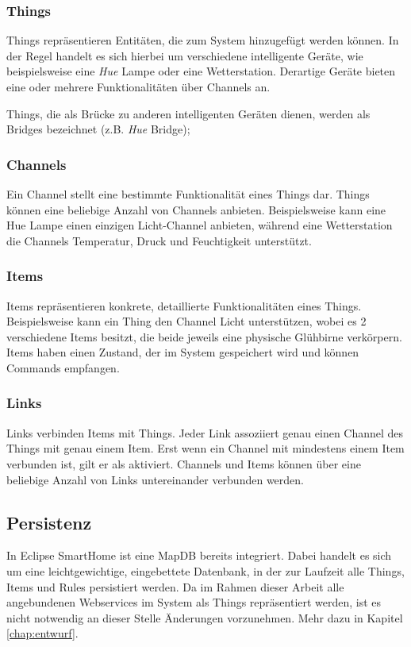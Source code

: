 \subsubsection{Things}
Things repräsentieren Entitäten, die zum System hinzugefügt werden können. In der Regel handelt es sich hierbei um verschiedene intelligente Geräte, wie beispielsweise eine \textit{Hue} Lampe oder eine Wetterstation. Derartige Geräte bieten eine oder mehrere Funktionalitäten über Channels an.

Things, die als Brücke zu anderen intelligenten Geräten dienen, werden als Bridges bezeichnet (z.B. \textit{Hue} Bridge);

\subsubsection{Channels}
Ein Channel stellt eine bestimmte Funktionalität eines Things dar. Things können eine beliebige Anzahl von Channels anbieten. Beispielsweise kann eine Hue Lampe einen einzigen \glqq Licht\grqq -Channel anbieten, während eine Wetterstation die Channels \glqq Temperatur\grqq , \glqq Druck\grqq{} und \glqq Feuchtigkeit\grqq{} unterstützt.

\subsubsection{Items}
Items repräsentieren konkrete, detaillierte Funktionalitäten eines Things. Beispielsweise kann ein Thing den Channel \glqq Licht\grqq{} unterstützen, wobei es 2 verschiedene Items besitzt, die beide jeweils eine physische Glühbirne verkörpern. Items haben einen Zustand, der im System gespeichert wird und können Commands empfangen.

\subsubsection{Links}
Links verbinden Items mit Things. Jeder Link assoziiert genau einen Channel des Things mit genau einem Item. Erst wenn ein Channel mit mindestens einem Item verbunden ist, gilt er als \glqq aktiviert\grqq{}. Channels und Items können über eine beliebige Anzahl von Links untereinander verbunden werden.


\subsection{Persistenz}
In Eclipse SmartHome ist eine MapDB bereits integriert. Dabei handelt es sich um eine leichtgewichtige, eingebettete Datenbank, in der zur Laufzeit alle Things, Items und Rules persistiert werden. Da im Rahmen dieser Arbeit alle angebundenen Webservices im System als Things repräsentiert werden, ist es nicht notwendig an dieser Stelle Änderungen vorzunehmen. Mehr dazu in Kapitel \ref{chap:entwurf}.

